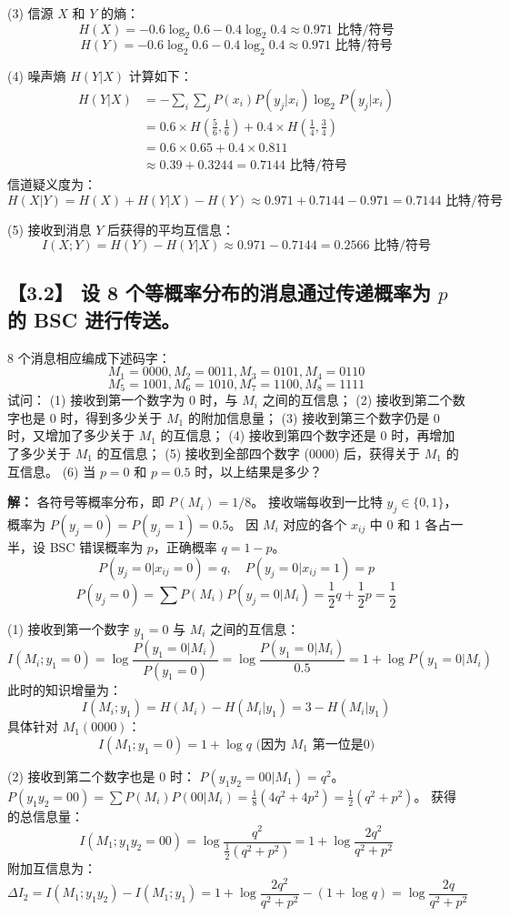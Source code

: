\documentclass[11pt, a4paper]{article}
\begin{document}
(3) 信源 $X$ 和 $Y$ 的熵：
\[ H(X) = -0.6\log_2 0.6 - 0.4\log_2 0.4 \approx 0.971 \text{ 比特/符号} \]
\[ H(Y) = -0.6\log_2 0.6 - 0.4\log_2 0.4 \approx 0.971 \text{ 比特/符号} \]

(4) 噪声熵 $H(Y|X)$ 计算如下：
\[ 
\begin{aligned}
H(Y|X) &= -\sum_i \sum_j P(x_i)P(y_j|x_i) \log_2 P(y_j|x_i) \\
&= 0.6 \times H(\frac{5}{6}, \frac{1}{6}) + 0.4 \times H(\frac{1}{4}, \frac{3}{4}) \\
&= 0.6 \times 0.65 + 0.4 \times 0.811 \\
&\approx 0.39 + 0.3244 = 0.7144 \text{ 比特/符号}
\end{aligned}
\]
信道疑义度为：
\[ H(X|Y) = H(X) + H(Y|X) - H(Y) \approx 0.971 + 0.7144 - 0.971 = 0.7144 \text{ 比特/符号} \]

(5) 接收到消息 $Y$ 后获得的平均互信息：
\[ I(X;Y) = H(Y) - H(Y|X) \approx 0.971 - 0.7144 = 0.2566 \text{ 比特/符号} \]

\subsection*{【3.2】 设 8 个等概率分布的消息通过传递概率为 $p$ 的 BSC 进行传送。}
8 个消息相应编成下述码字：
\[ M_1=0000, M_2=0011, M_3=0101, M_4=0110 \]
\[ M_5=1001, M_6=1010, M_7=1100, M_8=1111 \]
试问：
(1) 接收到第一个数字为 0 时，与 $M_i$ 之间的互信息；
(2) 接收到第二个数字也是 0 时，得到多少关于 $M_1$ 的附加信息量；
(3) 接收到第三个数字仍是 0 时，又增加了多少关于 $M_1$ 的互信息；
(4) 接收到第四个数字还是 0 时，再增加了多少关于 $M_1$ 的互信息；
(5) 接收到全部四个数字 (0000) 后，获得关于 $M_1$ 的互信息。
(6) 当 $p=0$ 和 $p=0.5$ 时，以上结果是多少？

\textbf{解：}
各符号等概率分布，即 $P(M_i) = 1/8$。
接收端每收到一比特 $y_j \in \{0, 1\}$，概率为 $P(y_j=0) = P(y_j=1) = 0.5$。
因 $M_i$ 对应的各个 $x_{ij}$ 中 0 和 1 各占一半，设 BSC 错误概率为 $p$，正确概率 $q=1-p$。
\[ P(y_j=0|x_{ij}=0)=q, \quad P(y_j=0|x_{ij}=1)=p \]
\[ P(y_j=0) = \sum P(M_i)P(y_j=0|M_i) = \frac{1}{2}q + \frac{1}{2}p = \frac{1}{2} \]

(1) 接收到第一个数字 $y_1=0$ 与 $M_i$ 之间的互信息：
\[ I(M_i; y_1=0) = \log \frac{P(y_1=0|M_i)}{P(y_1=0)} = \log \frac{P(y_1=0|M_i)}{0.5} = 1 + \log P(y_1=0|M_i) \]
此时的知识增量为：
\[ I(M_i; y_1) = H(M_i) - H(M_i|y_1) = 3 - H(M_i|y_1) \]
具体针对 $M_1 (0000)$：
\[ I(M_1; y_1=0) = 1 + \log q \text{ (因为 $M_1$ 第一位是0)} \]

(2) 接收到第二个数字也是 0 时：
$P(y_1 y_2 = 00 | M_1) = q^2$。
$P(y_1 y_2 = 00) = \sum P(M_i)P(00|M_i) = \frac{1}{8}(4q^2 + 4p^2) = \frac{1}{2}(q^2+p^2)$。
获得的总信息量：
\[ I(M_1; y_1y_2=00) = \log \frac{q^2}{\frac{1}{2}(q^2+p^2)} = 1 + \log \frac{2q^2}{q^2+p^2} \]
附加互信息为：
\[ \Delta I_2 = I(M_1; y_1y_2) - I(M_1; y_1) = 1 + \log \frac{2q^2}{q^2+p^2} - (1 + \log q) = \log \frac{2q}{q^2+p^2} \]
\end{document}

